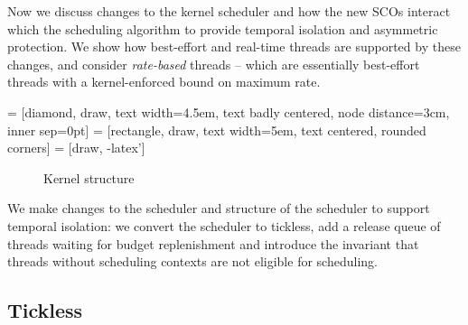 Now we discuss changes to the kernel scheduler and how the new \glspl{SCO} interact which the
scheduling algorithm to provide temporal isolation and asymmetric protection.
We show how best-effort and real-time threads are supported by these changes, and consider \emph{rate-based} threads -- which are essentially best-effort threads with a kernel-enforced bound on maximum rate.


 = [diamond, draw,
    text width=4.5em, text badly centered, node distance=3cm, inner sep=0pt]
 = [rectangle, draw,
    text width=5em, text centered, rounded corners]
 = [draw, -latex']


\begin{figure}
\caption{Kernel structure}
\label{figure:tickless}
\end{figure}

We make changes to the scheduler and structure of the scheduler to support temporal isolation: we
convert the scheduler to tickless, add a release queue of threads waiting for budget replenishment
and introduce the invariant that threads without scheduling contexts are not eligible for
scheduling.

\subsection{Tickless}

